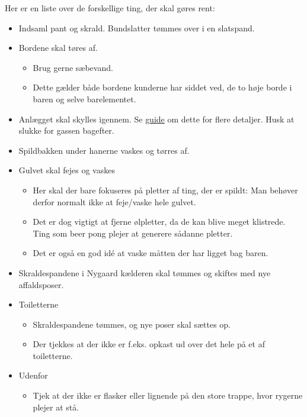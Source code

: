 Her er en liste over de forskellige ting, der skal gøres rent:
\begin{itemize}
	\item Indsaml pant og skrald. Bundslatter tømmes over i en slatspand.
	\item Bordene skal tøres af.
	\begin{itemize}
		\item Brug gerne sæbevand.
		\item Dette gælder både bordene kunderne har siddet ved, de to høje
			borde i baren og selve barelementet.
	\end{itemize}
	\item Anlægget skal skylles igennem. Se \href{https://media.fredagscafeen.dk/guides/rensningafanlaeg.pdf}{guide} om dette for flere
	detaljer. Husk at slukke for gassen bagefter.
	\item Spildbakken under hanerne vaskes og tørres af.
	\item Gulvet skal fejes og vaskes
	\begin{itemize}
		\item Her skal der bare fokuseres på pletter af ting, der er spildt:
			Man behøver derfor normalt ikke at feje/vaske hele gulvet.
		\item Det er dog vigtigt at fjerne ølpletter, da de kan blive meget
			klistrede. Ting som beer pong plejer at generere sådanne pletter.
		\item Det er også en god idé at vaske måtten der har ligget bag baren.
	\end{itemize}
	\item Skraldespandene i Nygaard kælderen skal tømmes og skiftes med nye affaldsposer.
	\item Toiletterne
	\begin{itemize}
		\item Skraldespandene tømmes, og nye poser skal sættes op.
		\item Der tjekkes at der ikke er f.eks. opkast ud over det hele på
			et af toiletterne.
	\end{itemize}
	\item Udenfor
	\begin{itemize}
		\item Tjek at der ikke er flasker eller lignende på den store trappe,
			hvor rygerne plejer at stå.
	\end{itemize}
\end{itemize}
